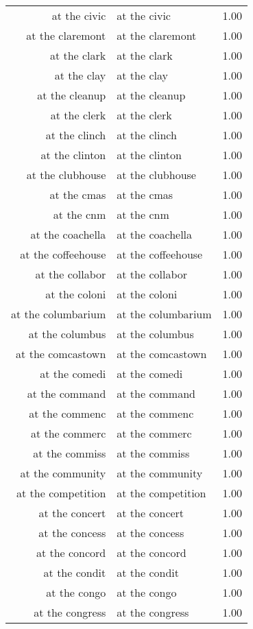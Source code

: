 \begin{table}[ht]
\begin{tabular}{rlr}
  at the civic & at the civic & 1.00 \\ 
  at the claremont & at the claremont & 1.00 \\ 
  at the clark & at the clark & 1.00 \\ 
  at the clay & at the clay & 1.00 \\ 
  at the cleanup & at the cleanup & 1.00 \\ 
  at the clerk & at the clerk & 1.00 \\ 
  at the clinch & at the clinch & 1.00 \\ 
  at the clinton & at the clinton & 1.00 \\ 
  at the clubhouse & at the clubhouse & 1.00 \\ 
  at the cmas & at the cmas & 1.00 \\ 
  at the cnm & at the cnm & 1.00 \\ 
  at the coachella & at the coachella & 1.00 \\ 
  at the coffeehouse & at the coffeehouse & 1.00 \\ 
  at the collabor & at the collabor & 1.00 \\ 
  at the coloni & at the coloni & 1.00 \\ 
  at the columbarium & at the columbarium & 1.00 \\ 
  at the columbus & at the columbus & 1.00 \\ 
  at the comcastown & at the comcastown & 1.00 \\ 
  at the comedi & at the comedi & 1.00 \\ 
  at the command & at the command & 1.00 \\ 
  at the commenc & at the commenc & 1.00 \\ 
  at the commerc & at the commerc & 1.00 \\ 
  at the commiss & at the commiss & 1.00 \\ 
  at the community & at the community & 1.00 \\ 
  at the competition & at the competition & 1.00 \\ 
  at the concert & at the concert & 1.00 \\ 
  at the concess & at the concess & 1.00 \\ 
  at the concord & at the concord & 1.00 \\ 
  at the condit & at the condit & 1.00 \\ 
  at the congo & at the congo & 1.00 \\ 
  at the congress & at the congress & 1.00 \\ 

\end{tabular}
\end{table}
